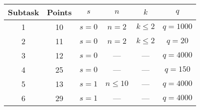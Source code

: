 \newcommand{\gt}{\textgreater} 
\newcommand{\lt}{\textless} 


\begin{center}
\renewcommand{\arraystretch}{1.5}
\begin{tabular}{|c|c|c|c|c|c|}
\hline
Subtask & Points & $s$ & $n$ & $k$ & $q$\\
\hline
1 & 10 & $s=0$ & $n=2$ & $k\leq2$ & $q=1000$ \\
\hline
2 & 11 & $s=0$ & $n=2$ & $k\leq2$ & $q=20$\\
\hline
3 & 12 & $s=0$ & --- & --- & $q=4000$\\
\hline
4 & 25 & $s=0$ & --- & --- & $q=150$ \\
\hline
5 & 13 & $s=1$ & $n \leq 10$ & --- & $q=4000$\\
\hline
6 & 29 & $s=1$ & --- & --- & $q=4000$\\
\hline
\end{tabular}
\end{center}